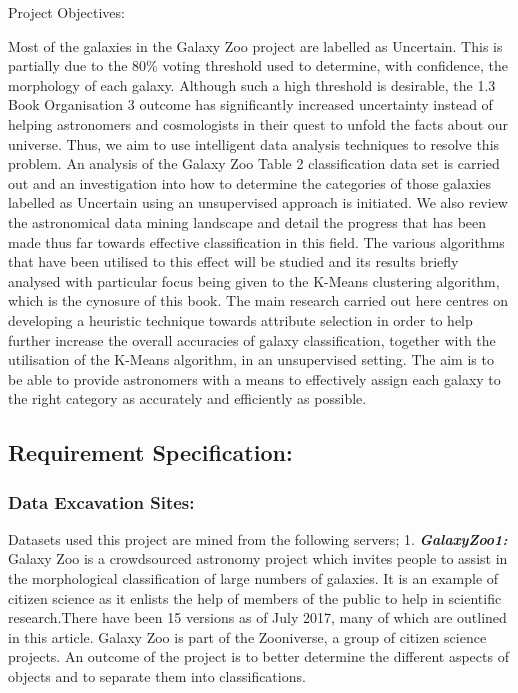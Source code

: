 \documentclass[11pt]{article}
\begin{document}
Project Objectives:

Most of the galaxies in the Galaxy Zoo project are labelled as
Uncertain. This is partially due to the 80\% voting threshold used to
determine, with confidence, the morphology of each galaxy. Although such
a high threshold is desirable, the 1.3 Book Organisation 3 outcome has
significantly increased uncertainty instead of helping astronomers and
cosmologists in their quest to unfold the facts about our universe.
Thus, we aim to use intelligent data analysis techniques to resolve this
problem. An analysis of the Galaxy Zoo Table 2 classification data set
is carried out and an investigation into how to determine the categories
of those galaxies labelled as Uncertain using an unsupervised approach
is initiated. We also review the astronomical data mining landscape and
detail the progress that has been made thus far towards effective
classification in this field. The various algorithms that have been
utilised to this effect will be studied and its results briefly analysed
with particular focus being given to the K-Means clustering algorithm,
which is the cynosure of this book. The main research carried out here
centres on developing a heuristic technique towards attribute selection
in order to help further increase the overall accuracies of galaxy
classification, together with the utilisation of the K-Means algorithm,
in an unsupervised setting. The aim is to be able to provide astronomers
with a means to effectively assign each galaxy to the right category as
accurately and efficiently as possible.

    \subsection{Requirement Specification:}\label{requirement-specification}

\subsubsection{Data Excavation Sites:}\label{data-excavation-sites}

Datasets used this project are mined from the following servers; 1.
\textbf{\emph{GalaxyZoo1:}} Galaxy Zoo is a crowdsourced astronomy
project which invites people to assist in the morphological
classification of large numbers of galaxies. It is an example of citizen
science as it enlists the help of members of the public to help in
scientific research.There have been 15 versions as of July 2017, many of
which are outlined in this article. Galaxy Zoo is part of the
Zooniverse, a group of citizen science projects. An outcome of the
project is to better determine the different aspects of objects and to
separate them into classifications.
\end{document}
